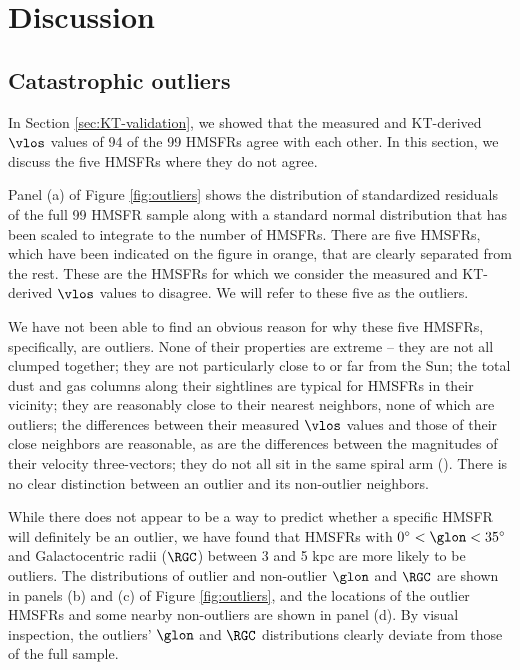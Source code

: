\section{Discussion}
\label{sec:discussion}

\subsection{Catastrophic outliers}
\label{sec:discussion-catastrophic}
In Section \ref{sec:KT-validation}, we showed that the measured and KT-derived $\vlos$ values  of 94 of the 99 \Reid HMSFRs agree with each other. 
In this section, we discuss the five HMSFRs where they do not agree.

Panel (a) of Figure \ref{fig:outliers} shows the distribution of standardized residuals of the full 99 HMSFR sample along with a standard normal distribution that has been scaled to integrate to the number of HMSFRs.
There are five HMSFRs, which have been indicated on the figure in orange, that are clearly separated from the rest. 
These are the HMSFRs for which we consider the measured and KT-derived $\vlos$ values to disagree.
We will refer to these five as the outliers.

We have not been able to find an obvious reason for why these five HMSFRs, specifically, are outliers. 
None of their properties are extreme -- they are not all clumped together; they are not particularly close to or far from the Sun; the total dust and gas columns along their sightlines are typical for HMSFRs in their vicinity; they are reasonably close to their nearest neighbors, none of which are outliers; the differences between their measured $\vlos$ values and those of their close neighbors are reasonable, as are the differences between the magnitudes of their velocity three-vectors; they do not all sit in the same spiral arm (\Reid). 
There is no clear distinction between an outlier and its non-outlier neighbors. 

While there does not appear to be a way to predict whether a specific HMSFR will definitely be an outlier, we have found that HMSFRs with $0^\circ < \glon < 35^\circ$ and Galactocentric radii ($\RGC$) between 3 and 5 kpc are more likely to be outliers. 
The distributions of outlier and non-outlier $\glon$ and $\RGC$ are shown in panels (b) and (c) of Figure \ref{fig:outliers}, and the locations of the outlier HMSFRs and some nearby non-outliers are shown in panel (d).
By visual inspection, the outliers' $\glon$ and $\RGC$ distributions clearly deviate from those of the full sample.

